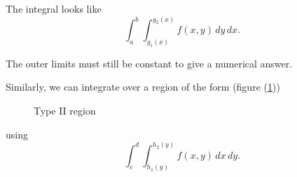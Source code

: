   The integral looks like
    \[
      \int_a^b \int_{g_1(x)}^{g_2(x)} f(x, y) \, dy \, dx.
    \]

  The outer limits must still be constant to give a numerical answer.

  Similarly, we can integrate over a region of the form (figure (\ref{typeiiregion}))
  \begin{figure}[H]
    \centering
    \def\svgwidth{0.47\columnwidth}
    
    \caption{Type II region}
    \label{typeiiregion}
  \end{figure}
  using
    \[
      \int_c^d \int_{h_1(y)}^{h_2(y)} f(x, y) \, dx \, dy.
    \]

